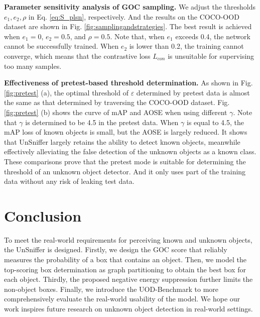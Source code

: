 \documentclass[10pt,twocolumn,letterpaper]{article}
\newcommand{\net}{UnSniffer\xspace}
\begin{document}
\noindent\textbf{Parameter sensitivity analysis of GOC sampling.}
We adjust the thresholds $e_1, e_2, \rho$ in Eq. \ref{eq:S_plsn}, respectively.
And the results on the COCO-OOD dataset are shown in Fig. \ref{fig:samplingandstrategies}.
The best result is achieved when $e_1=0$, $e_2=0.5$, and $\rho=0.5$.
Note that, when $e_1$ exceeds 0.4,
the network cannot be successfully trained.
When $e_2$ is lower than 0.2,
the training cannot converge,
which means that the contrastive loss $L_{con}$ is unsuitable for supervising too many samples.



\noindent\textbf{Effectiveness of pretest-based threshold determination.}
As shown in Fig. \ref{fig:pretest} (a),
the optimal threshold of $\varepsilon$ determined by pretest data is almost the same as that determined by traversing the COCO-OOD dataset.
Fig. \ref{fig:pretest} (b) shows the curve of mAP and AOSE when using different $\gamma$.
Note that $\gamma$ is determined to be 4.5 in the pretest data.
When $\gamma$ is equal to 4.5,
the mAP loss of known objects is small,
but the AOSE is largely reduced.
It shows that UnSniffer largely retains the ability to detect known objects,
meanwhile effectively alleviating the false detection of the unknown objects as a known class.
These comparisons prove that the pretest mode is suitable for determining the threshold of an unknown object detector.
And it only uses part of the training data without any risk of leaking test data.



\section{Conclusion}
\label{sec:conclusion}
To meet the real-world requirements for perceiving known and unknown objects,
the \net is designed.
Firstly,
we design the GOC score that reliably measures the probability of a box that contains an object.
Then, we model the top-scoring box determination as graph partitioning to obtain the best box for each object.
Thirdly,
the proposed negative energy suppression further limits the non-object boxes.
Finally, we introduce the UOD-Benchmark to more comprehensively evaluate the real-world usability of the model.
We hope our work inspires future research on unknown object detection in real-world settings.

{\small


}
\end{document}
